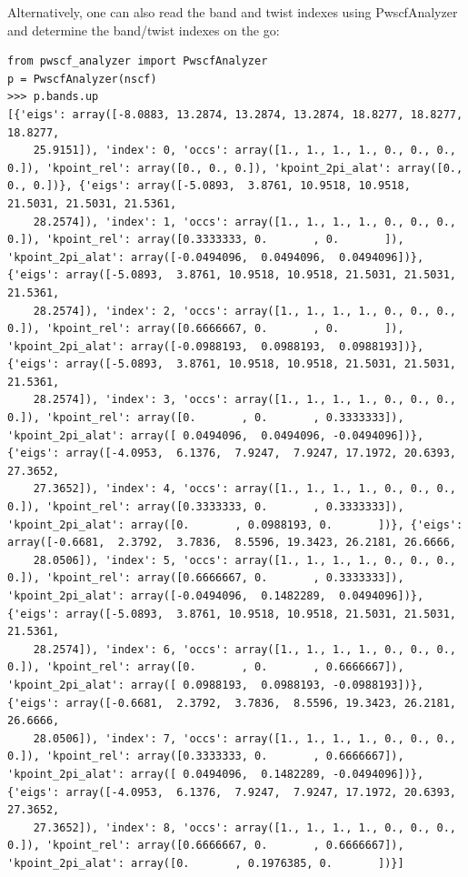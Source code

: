 Alternatively, one can also read the band and twist indexes using PwscfAnalyzer and determine the band/twist indexes on the go:
\begin{lstlisting}[style=Python]
from pwscf_analyzer import PwscfAnalyzer
p = PwscfAnalyzer(nscf)
>>> p.bands.up
[{'eigs': array([-8.0883, 13.2874, 13.2874, 13.2874, 18.8277, 18.8277, 18.8277,
	25.9151]), 'index': 0, 'occs': array([1., 1., 1., 1., 0., 0., 0., 0.]), 'kpoint_rel': array([0., 0., 0.]), 'kpoint_2pi_alat': array([0., 0., 0.])}, {'eigs': array([-5.0893,  3.8761, 10.9518, 10.9518, 21.5031, 21.5031, 21.5361,
	28.2574]), 'index': 1, 'occs': array([1., 1., 1., 1., 0., 0., 0., 0.]), 'kpoint_rel': array([0.3333333, 0.       , 0.       ]), 'kpoint_2pi_alat': array([-0.0494096,  0.0494096,  0.0494096])}, {'eigs': array([-5.0893,  3.8761, 10.9518, 10.9518, 21.5031, 21.5031, 21.5361,
	28.2574]), 'index': 2, 'occs': array([1., 1., 1., 1., 0., 0., 0., 0.]), 'kpoint_rel': array([0.6666667, 0.       , 0.       ]), 'kpoint_2pi_alat': array([-0.0988193,  0.0988193,  0.0988193])}, {'eigs': array([-5.0893,  3.8761, 10.9518, 10.9518, 21.5031, 21.5031, 21.5361,
	28.2574]), 'index': 3, 'occs': array([1., 1., 1., 1., 0., 0., 0., 0.]), 'kpoint_rel': array([0.       , 0.       , 0.3333333]), 'kpoint_2pi_alat': array([ 0.0494096,  0.0494096, -0.0494096])}, {'eigs': array([-4.0953,  6.1376,  7.9247,  7.9247, 17.1972, 20.6393, 27.3652,
	27.3652]), 'index': 4, 'occs': array([1., 1., 1., 1., 0., 0., 0., 0.]), 'kpoint_rel': array([0.3333333, 0.       , 0.3333333]), 'kpoint_2pi_alat': array([0.       , 0.0988193, 0.       ])}, {'eigs': array([-0.6681,  2.3792,  3.7836,  8.5596, 19.3423, 26.2181, 26.6666,
	28.0506]), 'index': 5, 'occs': array([1., 1., 1., 1., 0., 0., 0., 0.]), 'kpoint_rel': array([0.6666667, 0.       , 0.3333333]), 'kpoint_2pi_alat': array([-0.0494096,  0.1482289,  0.0494096])}, {'eigs': array([-5.0893,  3.8761, 10.9518, 10.9518, 21.5031, 21.5031, 21.5361,
	28.2574]), 'index': 6, 'occs': array([1., 1., 1., 1., 0., 0., 0., 0.]), 'kpoint_rel': array([0.       , 0.       , 0.6666667]), 'kpoint_2pi_alat': array([ 0.0988193,  0.0988193, -0.0988193])}, {'eigs': array([-0.6681,  2.3792,  3.7836,  8.5596, 19.3423, 26.2181, 26.6666,
	28.0506]), 'index': 7, 'occs': array([1., 1., 1., 1., 0., 0., 0., 0.]), 'kpoint_rel': array([0.3333333, 0.       , 0.6666667]), 'kpoint_2pi_alat': array([ 0.0494096,  0.1482289, -0.0494096])}, {'eigs': array([-4.0953,  6.1376,  7.9247,  7.9247, 17.1972, 20.6393, 27.3652,
	27.3652]), 'index': 8, 'occs': array([1., 1., 1., 1., 0., 0., 0., 0.]), 'kpoint_rel': array([0.6666667, 0.       , 0.6666667]), 'kpoint_2pi_alat': array([0.       , 0.1976385, 0.       ])}]
\end{lstlisting}


